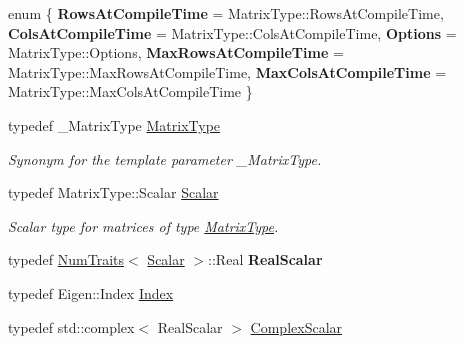 \begin{DoxyCompactItemize}
\item 
\mbox{\label{class_eigen_1_1_eigen_solver_ab01aedcbc1dadb56c1f5b132312fb314}} 
enum \{ \newline
{\bfseries Rows\+At\+Compile\+Time} = Matrix\+Type\+::Rows\+At\+Compile\+Time, 
{\bfseries Cols\+At\+Compile\+Time} = Matrix\+Type\+::Cols\+At\+Compile\+Time, 
{\bfseries Options} = Matrix\+Type\+::Options, 
{\bfseries Max\+Rows\+At\+Compile\+Time} = Matrix\+Type\+::Max\+Rows\+At\+Compile\+Time, 
\newline
{\bfseries Max\+Cols\+At\+Compile\+Time} = Matrix\+Type\+::Max\+Cols\+At\+Compile\+Time
 \}
\item 
\mbox{\label{class_eigen_1_1_eigen_solver_a83acd180404ddaac8a678fa65a6b632b}} 
typedef \+\_\+\+Matrix\+Type \mbox{\hyperlink{class_eigen_1_1_eigen_solver_a83acd180404ddaac8a678fa65a6b632b}{Matrix\+Type}}
\begin{DoxyCompactList}\small\item\em Synonym for the template parameter {\ttfamily \+\_\+\+Matrix\+Type}. \end{DoxyCompactList}\item 
\mbox{\label{class_eigen_1_1_eigen_solver_a017d49fe0d59874b70a2fcf35e5aa373}} 
typedef Matrix\+Type\+::\+Scalar \mbox{\hyperlink{class_eigen_1_1_eigen_solver_a017d49fe0d59874b70a2fcf35e5aa373}{Scalar}}
\begin{DoxyCompactList}\small\item\em Scalar type for matrices of type \mbox{\hyperlink{class_eigen_1_1_eigen_solver_a83acd180404ddaac8a678fa65a6b632b}{Matrix\+Type}}. \end{DoxyCompactList}\item 
\mbox{\label{class_eigen_1_1_eigen_solver_aad50fbc086d07e69015426ffd11f7e44}} 
typedef \mbox{\hyperlink{struct_eigen_1_1_num_traits}{Num\+Traits}}$<$ \mbox{\hyperlink{class_eigen_1_1_eigen_solver_a017d49fe0d59874b70a2fcf35e5aa373}{Scalar}} $>$\+::Real {\bfseries Real\+Scalar}
\item 
typedef Eigen\+::\+Index \mbox{\hyperlink{class_eigen_1_1_eigen_solver_a5bff6a6bc0efac67d52c60c2c3deb9ee}{Index}}
\item 
typedef std\+::complex$<$ Real\+Scalar $>$ \mbox{\hyperlink{class_eigen_1_1_eigen_solver_a4d0b2a773357d0a6ec98e026f04002ed}{Complex\+Scalar}}

\end{DoxyCompactItemize}
